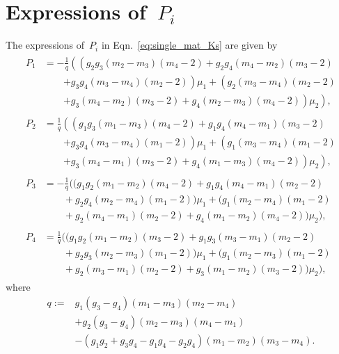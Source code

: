 \documentclass[preprint,12pt,times]{elsarticle}
\numberwithin{equation}{section}
\renewcommand{\>}{$\Rightarrow$}
\begin{document}
\section{Expressions of~$P_i$}
\label{Appen:Pi}
The expressions of~$P_i$ in Eqn.~\eqref{eq:single_mat_Ks} are given by
\begin{subequations}
\begin{align}
	\begin{split}
	P_1 & = -\frac{1}{q} \left(\left(g_2 g_3 (m_2 - m_3)(m_4 -2) + g_2 g_4 (m_4 - m_2)(m_3 - 2) \right.\right.\\
	&\qquad{} \left. + g_3 g_4 (m_3 - m_4)(m_2 -2) \right) \mu_1  + \left(g_2 (m_3 - m_4)(m_2 -2) \right. \\
	&\qquad{} \left.\left. + g_3(m_4 - m_2)(m_3 -2) + g_4 (m_2 - m_3)(m_4 -2) \right)\mu_2 \right) ,
	\end{split} \\
	\begin{split}
	P_2 & = \frac{1}{q} \left(\left( g_1 g_3 (m_1 - m_3)(m_4 -2) + g_1 g_4 (m_4 - m_1)(m_3 - 2)\right.\right. \\
	&\qquad{} \left. + g_3 g_4 (m_3 - m_4)(m_1 -2)  \right) \mu_1 + \left(g_1 (m_3 - m_4)(m_1 -2) \right.\\
	&\qquad{} \left.\left. + g_3(m_4 - m_1)(m_3 -2) + g_4 (m_1 - m_3)(m_4 -2)  \right)\mu_2  \right),
	\end{split} \\
	\begin{split}
	P_3 & = -\frac{1}{q} ((g_1 g_2 (m_1 - m_2)(m_4 -2) + g_1 g_4 (m_4 - m_1)(m_2 - 2) \\ &\qquad{} + g_2 g_4 (m_2 - m_4)(m_1 -2) ) \mu_1 + (g_1 (m_2 - m_4)(m_1 -2) \\  &\qquad{} + g_2(m_4 - m_1)(m_2 -2) + g_4 (m_1 - m_2)(m_4 -2))\mu_2),
	\end{split} \\
	\begin{split}
	P_4 & = \frac{1}{q} ((g_1 g_2 (m_1 - m_2)(m_3 -2) + g_1 g_3 (m_3 - m_1)(m_2 - 2) \\ &\qquad{} + g_2 g_3 (m_2 - m_3)(m_1 -2)) \mu_1 +  (g_1 (m_2 - m_3)(m_1 -2) \\  &\qquad{} + g_2(m_3 - m_1)(m_2 -2) + g_3 (m_1 - m_2)(m_3 -2))\mu_2),
	\end{split}
	\end{align}
\end{subequations}
where
\begin{equation}
	\begin{aligned}
	q := & g_1(g_3 - g_4)(m_1 - m_3)(m_2 - m_4) \\
	 	& + g_2(g_3 - g_4)(m_2 - m_3)(m_4 - m_1) \\
	 	& - (g_1 g_2 + g_3 g_4 - g_1 g_4 - g_2 g_4)(m_1 - m_2)(m_3 - m_4).
	\end{aligned}
\end{equation}
\end{document}
